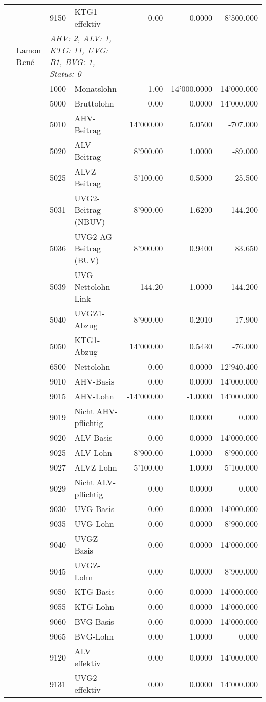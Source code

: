 \documentclass[15pt,a4paper]{article}
\begin{document}
\begin{longtable}{@{\extracolsep{\fill}}l l l l|r|r|r}
&&9150&KTG1 effektiv&0.00&0.0000&8'500.000\\
\pagebreak
22&Lamon René&\multicolumn{2}{l|}{\small\emph{AHV: 2, ALV: 1, KTG: 11, UVG: B1, BVG: 1, Status: 0}}&& \\
&&1000&Monatslohn&1.00&14'000.0000&14'000.000\\
&&5000&Bruttolohn&0.00&0.0000&14'000.000\\
&&5010&AHV-Beitrag&14'000.00&5.0500&-707.000\\
&&5020&ALV-Beitrag&8'900.00&1.0000&-89.000\\
&&5025&ALVZ-Beitrag&5'100.00&0.5000&-25.500\\
&&5031&UVG2-Beitrag (NBUV)&8'900.00&1.6200&-144.200\\
&&5036&UVG2 AG-Beitrag (BUV)&8'900.00&0.9400&83.650\\
&&5039&UVG-Nettolohn-Link&-144.20&1.0000&-144.200\\
&&5040&UVGZ1-Abzug&8'900.00&0.2010&-17.900\\
&&5050&KTG1-Abzug&14'000.00&0.5430&-76.000\\
&&6500&Nettolohn&0.00&0.0000&12'940.400\\
&&9010&AHV-Basis&0.00&0.0000&14'000.000\\
&&9015&AHV-Lohn&-14'000.00&-1.0000&14'000.000\\
&&9019&Nicht AHV-pflichtig&0.00&0.0000&0.000\\
&&9020&ALV-Basis&0.00&0.0000&14'000.000\\
&&9025&ALV-Lohn&-8'900.00&-1.0000&8'900.000\\
&&9027&ALVZ-Lohn&-5'100.00&-1.0000&5'100.000\\
&&9029&Nicht ALV-pflichtig&0.00&0.0000&0.000\\
&&9030&UVG-Basis&0.00&0.0000&14'000.000\\
&&9035&UVG-Lohn&0.00&0.0000&8'900.000\\
&&9040&UVGZ-Basis&0.00&0.0000&14'000.000\\
&&9045&UVGZ-Lohn&0.00&0.0000&8'900.000\\
&&9050&KTG-Basis&0.00&0.0000&14'000.000\\
&&9055&KTG-Lohn&0.00&0.0000&14'000.000\\
&&9060&BVG-Basis&0.00&0.0000&14'000.000\\
&&9065&BVG-Lohn&0.00&1.0000&0.000\\
&&9120&ALV effektiv&0.00&0.0000&14'000.000\\
&&9131&UVG2 effektiv&0.00&0.0000&14'000.000\\

\end{longtable}
\end{document}
